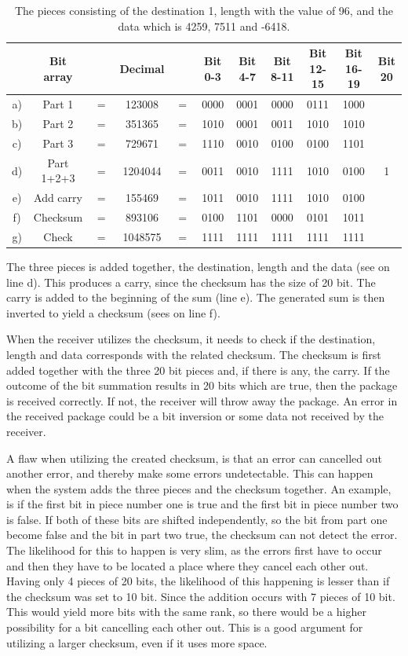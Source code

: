 \begin{table}[H]
\centering
\begin{tabular}{c c c c c c c c c c c}
   & Bit array  &     & Decimal &     & Bit 0-3 & Bit 4-7 & Bit 8-11 & Bit 12-15 & Bit 16-19 & Bit 20 \\
\hline
a) & Part 1     & $=$ & 123008  & $=$ & 0000 & 0001 & 0000 & 0111 & 1000 & \\
b) & Part 2     & $=$ & 351365  & $=$ & 1010 & 0001 & 0011 & 1010 & 1010 & \\
c) & Part 3     & $=$ & 729671  & $=$ & 1110 & 0010 & 0100 & 0100 & 1101 & \\
d) & Part 1+2+3 & $=$ & 1204044 & $=$ & 0011 & 0010 & 1111 & 1010 & 0100 & 1 \\
e) & Add carry  & $=$ & 155469  & $=$ & 1011 & 0010 & 1111 & 1010 & 0100 & \\
f) & Checksum   & $=$ & 893106  & $=$ & 0100 & 1101 & 0000 & 0101 & 1011 & \\
g) & Check      & $=$ & 1048575 & $=$ & 1111 & 1111 & 1111 & 1111 & 1111 & \\
\end{tabular}
\caption{The pieces consisting of the destination 1, length with the value of 96, and the data which is 4259, 7511 and -6418.}
\label{ChecksumExp}
\end{table}

The three pieces is added together, the destination, length and the data (see on line d). This produces a carry, since the checksum has the size of 20 bit. The carry is added to the beginning of the sum (line e). The generated sum is then inverted to yield a checksum (sees on line f).

When the receiver utilizes the checksum, it needs to check if the destination, length and data corresponds with the related checksum. The checksum is first added together with the three 20 bit pieces and, if there is any, the carry. If the outcome of the bit summation results in 20 bits which are true, then the package is received correctly. If not, the receiver will throw away the package. An error in the received package could be a bit inversion or some data not received by the receiver. 

A flaw when utilizing the created checksum, is that an error can cancelled out another error, and thereby make some errors undetectable. This can happen when the system adds the three pieces and the checksum together. An example, is if the first bit in piece number one is true and the first bit in piece number two is false. If both of these bits are shifted independently, so the bit from part one become false and the bit in part two true, the checksum can not detect the error. The likelihood for this to happen is very slim, as the errors first have to occur and then they have to be located a place where they cancel each other out. Having only 4 pieces of 20 bits, the likelihood of this happening is lesser than if the checksum was set to 10 bit. Since the addition occurs with 7 pieces of 10 bit. This would yield more bits with the same rank, so there would be a higher possibility for a bit cancelling each other out. This is a good argument for utilizing a larger checksum, even if it uses more space.

